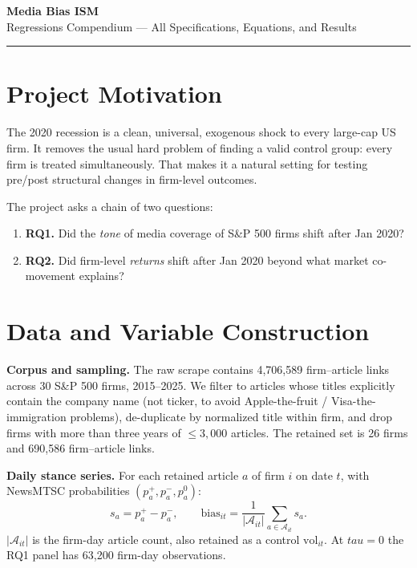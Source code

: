 \documentclass[11pt]{article}
\def\tau{tau}%
\begin{document}
\begin{center}
{\LARGE \textbf{Media Bias ISM}}\\
\vspace{0.15em}
{\normalsize Regressions Compendium --- All Specifications, Equations, and Results}\\
\end{center}
\vspace{0.2em}
\hrule
\vspace{0.5em}
\small

\section*{Project Motivation}\label{sec:motivation}
The 2020 recession is a clean, universal, exogenous shock to every large-cap US firm. It removes the usual hard problem of finding a valid control group: every firm is treated simultaneously. That makes it a natural setting for testing pre/post structural changes in firm-level outcomes.

The project asks a chain of two questions:
\begin{enumerate}[leftmargin=1.7em]
\item \textbf{RQ1.} Did the \emph{tone} of media coverage of S\&P 500 firms shift after Jan 2020?
\item \textbf{RQ2.} Did firm-level \emph{returns} shift after Jan 2020 beyond what market co-movement explains?
\end{enumerate}

\section*{Data and Variable Construction}\label{sec:data}
\textbf{Corpus and sampling.} The raw scrape contains 4{,}706{,}589 firm--article links across 30 S\&P 500 firms, 2015--2025. We filter to articles whose titles explicitly contain the company name (not ticker, to avoid Apple-the-fruit / Visa-the-immigration problems), de-duplicate by normalized title within firm, and drop firms with more than three years of $\le 3{,}000$ articles. The retained set is 26 firms and 690{,}586 firm--article links.

\textbf{Daily stance series.} For each retained article $a$ of firm $i$ on date $t$, with NewsMTSC probabilities $(p_a^{+}, p_a^{-}, p_a^{0})$:
\[
s_a = p_a^{+} - p_a^{-},\qquad
\text{bias}_{it} = \frac{1}{|\mathcal{A}_{it}|}\sum_{a \in \mathcal{A}_{it}} s_a.
\]
$|\mathcal{A}_{it}|$ is the firm-day article count, also retained as a control $\text{vol}_{it}$. At $\tau=0$ the RQ1 panel has 63{,}200 firm-day observations.
\end{document}

